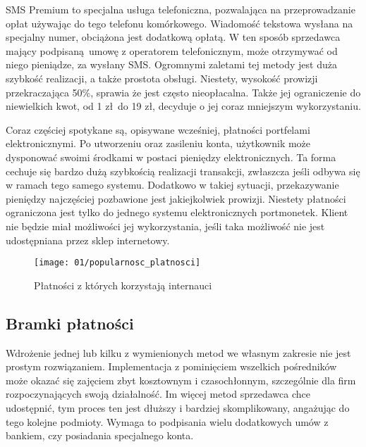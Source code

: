 SMS Premium to specjalna usługa telefoniczna, pozwalająca na przeprowadzanie opłat używając do tego telefonu komórkowego. Wiadomość tekstowa wysłana na specjalny numer, obciążona jest dodatkową opłatą. W ten sposób sprzedawca mający podpisaną umowę z operatorem telefonicznym, może otrzymywać od niego pieniądze, za wysłany SMS. Ogromnymi zaletami tej metody jest duża szybkość realizacji, a także prostota obsługi. Niestety, wysokość prowizji przekraczająca 50\%, sprawia że jest często nieopłacalna. Także jej ograniczenie do niewielkich kwot, od 1 zł do 19 zł, decyduje o jej coraz mniejszym wykorzystaniu.

Coraz częściej spotykane są, opisywane wcześniej, płatności portfelami elektronicznymi. Po utworzeniu oraz zasileniu konta, użytkownik może dysponować swoimi środkami w postaci pieniędzy elektronicznych. Ta forma cechuje się bardzo dużą szybkością realizacji transakcji, zwłaszcza jeśli odbywa się w ramach tego samego systemu. Dodatkowo w takiej sytuacji, przekazywanie pieniędzy najczęściej pozbawione jest jakiejkolwiek prowizji. Niestety płatności ograniczona jest tylko do jednego systemu elektronicznych portmonetek. Klient nie będzie miał możliwości jej wykorzystania, jeśli taka możliwość nie jest udostępniana przez sklep internetowy.
\begin{figure}[h]
	\begin{center}
		\texttt{[image: 01/popularnosc\_platnosci]}
	\end{center}
	\caption{Płatności z których korzystają internauci}
\end{figure}

\subsection{Bramki płatności}
Wdrożenie jednej lub kilku z wymienionych metod we własnym zakresie nie jest prostym rozwiązaniem. Implementacja z pominięciem wszelkich pośredników może okazać się zajęciem zbyt kosztownym i czasochłonnym, szczególnie dla firm rozpoczynających swoją działalność. Im więcej metod sprzedawca chce udostępnić, tym proces ten jest dłuższy i bardziej skomplikowany, angażując do tego kolejne podmioty. Wymaga to podpisania wielu dodatkowych umów z bankiem, czy posiadania specjalnego konta. 


